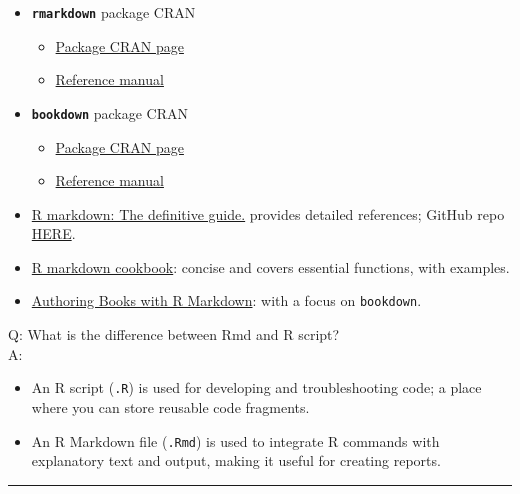\documentclass[
  a4paper,
  twoside,
  openright]{book}
\providecommand{\tightlist}{%
  \setlength{\itemsep}{0pt}\setlength{\parskip}{0pt}}
\theoremstyle{definition}
\theoremstyle{definition}
\theoremstyle{definition}
\theoremstyle{definition}
\theoremstyle{remark}
\begin{document}
\begin{itemize}
\tightlist
\item
  \textbf{\texttt{rmarkdown}} package CRAN

  \begin{itemize}
  \tightlist
  \item
    \href{https://cran.r-project.org/web/packages/rmarkdown/index.html}{Package CRAN page}
  \item
    \href{https://cran.r-project.org/web/packages/rmarkdown/rmarkdown.pdf}{Reference manual}
  \end{itemize}
\item
  \textbf{\texttt{bookdown}} package CRAN

  \begin{itemize}
  \tightlist
  \item
    \href{https://cran.r-project.org/web/packages/bookdown/index.html}{Package CRAN page}
  \item
    \href{https://cran.r-project.org/web/packages/bookdown/bookdown.pdf}{Reference manual}
  \end{itemize}
\item
  \href{https://bookdown.org/yihui/rmarkdown}{R markdown: The definitive guide.} provides detailed references; GitHub repo \href{https://github.com/rstudio/rmarkdown-book}{HERE}.
\item
  \href{https://bookdown.org/yihui/rmarkdown-cookbook/}{R markdown cookbook}: concise and covers essential functions, with examples.
\item
  \href{https://bookdown.org/yihui/bookdown/}{Authoring Books with R Markdown}: with a focus on \texttt{bookdown}.
\end{itemize}

Q: What is the difference between Rmd and R script?\\
A:

\begin{itemize}
\tightlist
\item
  An R script (\texttt{.R}) is used for developing and troubleshooting code; a place where you can store reusable code fragments.
\item
  An R Markdown file (\texttt{.Rmd}) is used to integrate R commands with explanatory text and output, making it useful for creating reports.
\end{itemize}

\begin{center}\rule{0.5\linewidth}{0.5pt}\end{center}
\end{document}

